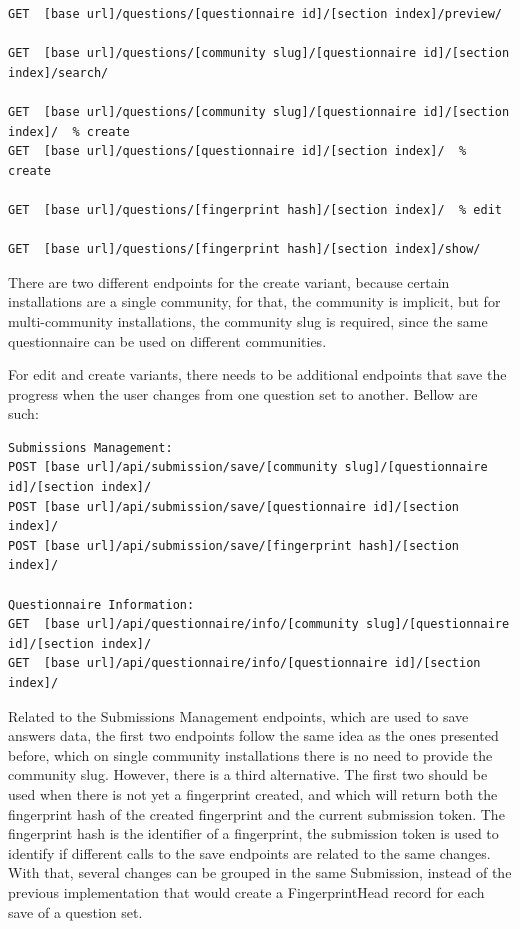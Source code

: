 \begin{lstlisting}[basicstyle=\tiny]
GET  [base url]/questions/[questionnaire id]/[section index]/preview/

GET  [base url]/questions/[community slug]/[questionnaire id]/[section index]/search/

GET  [base url]/questions/[community slug]/[questionnaire id]/[section index]/  % create
GET  [base url]/questions/[questionnaire id]/[section index]/  % create

GET  [base url]/questions/[fingerprint hash]/[section index]/  % edit

GET  [base url]/questions/[fingerprint hash]/[section index]/show/
\end{lstlisting}

There are two different endpoints for the create variant, because certain installations are a single community, for that, the community is implicit, but for multi-community installations, the community slug is required, since the same questionnaire can be used on different communities.

For edit and create variants, there needs to be additional endpoints that save the progress when the user changes from one question set to another.
Bellow are such:

\begin{lstlisting}[basicstyle=\scriptsize]
Submissions Management:
POST [base url]/api/submission/save/[community slug]/[questionnaire id]/[section index]/
POST [base url]/api/submission/save/[questionnaire id]/[section index]/
POST [base url]/api/submission/save/[fingerprint hash]/[section index]/

Questionnaire Information:
GET  [base url]/api/questionnaire/info/[community slug]/[questionnaire id]/[section index]/
GET  [base url]/api/questionnaire/info/[questionnaire id]/[section index]/
\end{lstlisting}

Related to the Submissions Management endpoints, which are used to save answers data, the first two endpoints follow the same idea as the ones presented before, which on single community installations there is no need to provide the community slug.
However, there is a third alternative.
The first two should be used when there is not yet a fingerprint created, and which will return both the fingerprint hash of the created fingerprint and the current submission token.
The fingerprint hash is the identifier of a fingerprint, the submission token is used to identify if different calls to the save endpoints are related to the same changes.
With that, several changes can be grouped in the same Submission, instead of the previous implementation that would create a FingerprintHead record for each save of a question set.

